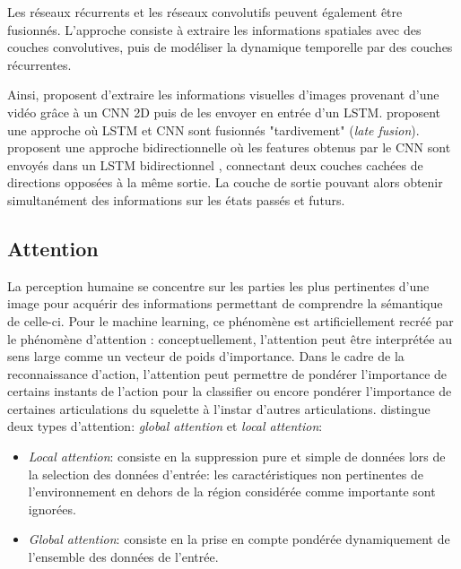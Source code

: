 Les réseaux récurrents et les réseaux convolutifs peuvent également être fusionnés. L'approche consiste à extraire les informations spatiales avec des couches convolutives, puis de modéliser la dynamique temporelle par des couches récurrentes.

Ainsi, \cite{donahue2015long} proposent d'extraire les informations visuelles d'images provenant d'une vidéo grâce à un CNN 2D puis de les envoyer en entrée d'un LSTM.
\cite{li2017skeleton} proposent une approche où LSTM et CNN sont fusionnés "tardivement" (\textit{late fusion}). \cite{ullah2017action} proposent une approche bidirectionnelle où les features obtenus par le CNN sont envoyés dans un LSTM bidirectionnel \cite{Schuster97bidirectionalrecurrent}, connectant deux couches cachées de directions opposées à la même sortie. La couche de sortie pouvant alors obtenir simultanément des informations sur les états passés et futurs.

\subsection{Attention}
La perception humaine se concentre sur les parties les plus pertinentes d'une image pour acquérir des informations permettant de comprendre la sémantique de celle-ci. Pour le machine learning, ce phénomène est artificiellement recréé  par le phénomène d'attention \cite{bahdanau2014neural,2017arXiv170603762V}: conceptuellement, l'attention peut être interprétée au sens large comme un vecteur de poids d'importance. 
Dans le cadre de la reconnaissance d'action, l'attention peut permettre de pondérer l'importance de certains instants de l'action pour la classifier ou encore pondérer l'importance de certaines articulations du squelette à l'instar d'autres articulations.
\cite{luong2015effective} distingue deux types d'attention: \textit{global attention} et \textit{local attention}:
 \begin{itemize}
     \item \textit{Local attention}: consiste en la suppression pure et simple de données lors de la selection des données d'entrée: les caractéristiques non pertinentes de l'environnement en dehors de la région considérée comme importante sont ignorées.
     \item \textit{Global attention}: consiste en la prise en compte pondérée dynamiquement de l'ensemble des données de l'entrée.
 \end{itemize}
 
 
